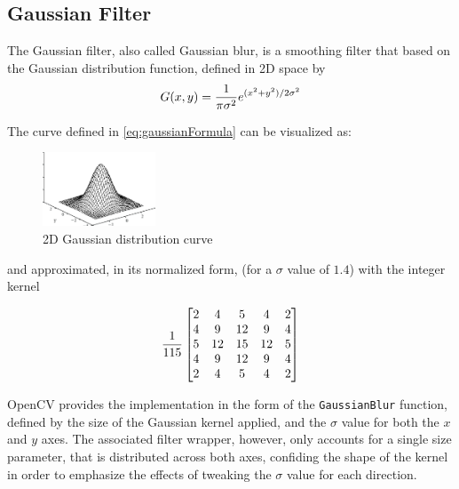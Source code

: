 \subsection{Gaussian Filter}

The Gaussian filter, also called Gaussian blur, is a smoothing filter that based on the
Gaussian distribution function, defined in 2D space \cite{gaussian} by
\begin{equation}
	\label{eq:gaussianFormula}
	G(x, y) = {1\over\pi \sigma^2}{e^{(x^2 + y^2) / 2\sigma^2}}
\end{equation}

The curve defined in \cref{eq:gaussianFormula} can be visualized as:
\begin{figure}[H]
	\includegraphics[width=0.30\textwidth, height=0.30\textwidth]{resources/Gaussian_Distribution.png}
	\caption{2D Gaussian distribution curve \cite{gaussian}}
\end{figure}

and approximated, in its normalized form, (for a \(\sigma\) value of \(1.4\)) with the integer kernel
\cite{gaussian}

\begin{equation}
	\label{eq:gaussianKernel}
	{1\over115}
	\begin{bmatrix}
		2 & 4  & 5  & 4  & 2 \\
		4 & 9  & 12 & 9  & 4 \\
		5 & 12 & 15 & 12 & 5 \\
		4 & 9  & 12 & 9  & 4 \\
		2 & 4  & 5  & 4  & 2 \\
	\end{bmatrix}
\end{equation}

OpenCV provides the implementation in the form of the \verb|GaussianBlur| function, defined by the size of
the Gaussian kernel applied, and the \(\sigma\) value for both the \(x\) and \(y\) axes. The associated
filter wrapper, however, only accounts for a single size parameter, that is distributed across both axes,
confiding the shape of the kernel in order to emphasize the effects of tweaking the \(\sigma\) value for
each direction.

